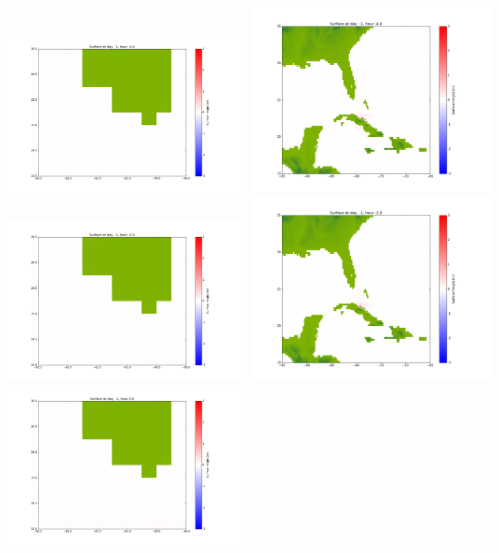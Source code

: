 \documentclass[11pt]{article}
\begin{document}
\vskip 10pt 
\includegraphics[width=0.475\textwidth]{frame0010fig1001.png}
\includegraphics[width=0.475\textwidth]{frame0010fig1002.png}
\vskip 10pt 
\includegraphics[width=0.475\textwidth]{frame0011fig1001.png}
\includegraphics[width=0.475\textwidth]{frame0011fig1002.png}
\vskip 10pt 
\includegraphics[width=0.475\textwidth]{frame0012fig1001.png}
\end{document}
